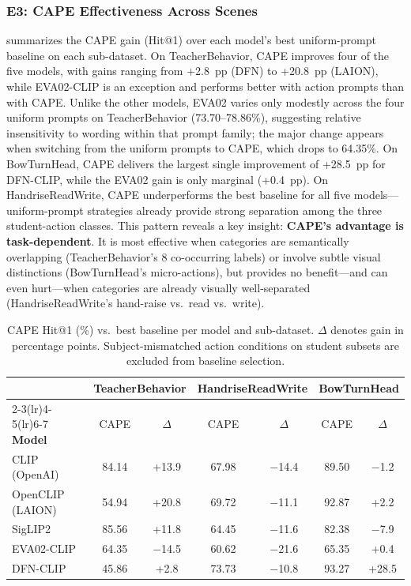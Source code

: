 \documentclass[symmetry,article,submit,pdftex,moreauthors]{Definitions/mdpi}
\begin{document}
\subsubsection{E3: CAPE Effectiveness Across Scenes}
\label{sec:e3}

 summarizes the CAPE gain (Hit@1) over each model's best uniform-prompt baseline on each sub-dataset.
On TeacherBehavior, CAPE improves four of the five models, with gains ranging from +2.8~pp (DFN) to +20.8~pp (LAION), while EVA02-CLIP is an exception and performs better with action prompts than with CAPE. Unlike the other models, EVA02 varies only modestly across the four uniform prompts on TeacherBehavior (73.70--78.86\%), suggesting relative insensitivity to wording within that prompt family; the major change appears when switching from the uniform prompts to CAPE, which drops to 64.35\%.
On BowTurnHead, CAPE delivers the largest single improvement of +28.5~pp for DFN-CLIP, while the EVA02 gain is only marginal (+0.4~pp).
On HandriseReadWrite, CAPE underperforms the best baseline for all five models---uniform-prompt strategies already provide strong separation among the three student-action classes.
This pattern reveals a key insight: \textbf{CAPE's advantage is task-dependent}. It is most effective when categories are semantically overlapping (TeacherBehavior's 8 co-occurring labels) or involve subtle visual distinctions (BowTurnHead's micro-actions), but provides no benefit---and can even hurt---when categories are already visually well-separated (HandriseReadWrite's hand-raise vs.\ read vs.\ write).

\begin{table}[H]
\caption{CAPE Hit@1 (\%) vs.\ best baseline per model and sub-dataset. $\Delta$ denotes gain in percentage points. Subject-mismatched action conditions on student subsets are excluded from baseline selection.}
\label{tab:cape_gain}
\centering
\small
\setlength{\tabcolsep}{3pt}
\begin{tabular}{l cc cc cc}
\toprule
 & \multicolumn{2}{c}{\textbf{TeacherBehavior}} & \multicolumn{2}{c}{\textbf{HandriseReadWrite}} & \multicolumn{2}{c}{\textbf{BowTurnHead}} \\
\cmidrule(lr){2-3}\cmidrule(lr){4-5}\cmidrule(lr){6-7}
\textbf{Model} & CAPE & $\Delta$ & CAPE & $\Delta$ & CAPE & $\Delta$ \\
\midrule
CLIP (OpenAI) & 84.14 & +13.9 & 67.98 & $-$14.4 & 89.50 & $-$1.2 \\
OpenCLIP (LAION) & 54.94 & +20.8 & 69.72 & $-$11.1 & 92.87 & +2.2 \\
SigLIP2 & 85.56 & +11.8 & 64.45 & $-$11.6 & 82.38 & $-$7.9 \\
EVA02-CLIP & 64.35 & $-$14.5 & 60.62 & $-$21.6 & 65.35 & +0.4 \\
DFN-CLIP & 45.86 & +2.8 & 73.73 & $-$10.8 & 93.27 & +28.5 \\
\bottomrule
\end{tabular}
\end{table}
\end{document}
